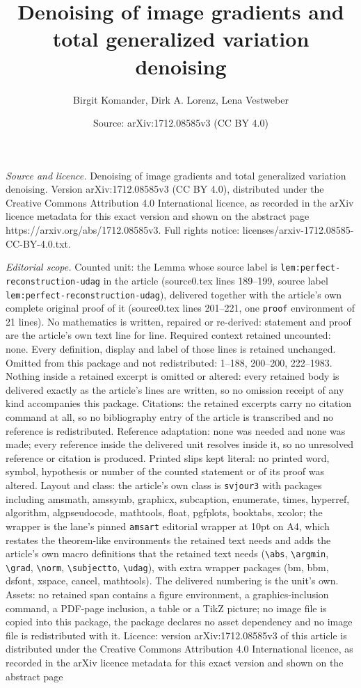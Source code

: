 \documentclass[10pt,a4paper]{amsart}
\title[Denoising of image gradients and total generalized variation]{Denoising of image gradients and total generalized variation denoising}
\author{Birgit Komander, Dirk A. Lorenz, Lena Vestweber}
\date{Source: arXiv:1712.08585v3 (CC BY 4.0)}
\begin{document}
\maketitle

\noindent\emph{Source and licence.} Denoising of image gradients and total generalized variation denoising. Version arXiv:1712.08585v3 (CC BY 4.0), distributed under the Creative Commons Attribution 4.0 International licence, as recorded in the arXiv licence metadata for this exact version and shown on the abstract page https://arxiv.org/abs/1712.08585v3. Full rights notice: licenses/arxiv-1712.08585-CC-BY-4.0.txt.\par\smallskip

\noindent\textit{Editorial scope.} Counted unit: the Lemma whose source label is \texttt{lem:perfect-reconstruction-udag} in the article (source0.tex lines 189--199, source label \texttt{lem:perfect-reconstruction-udag}), delivered together with the article's own complete original proof of it (source0.tex lines 201--221, one \texttt{proof} environment of 21 lines). No mathematics is written, repaired or re-derived: statement and proof are the article's own text line for line. Required context retained uncounted: none. Every definition, display and label of those lines is retained unchanged. Omitted from this package and not redistributed: 1--188, 200--200, 222--1983. Nothing inside a retained excerpt is omitted or altered: every retained body is delivered exactly as the article's lines are written, so no omission receipt of any kind accompanies this package. Citations: the retained excerpts carry no citation command at all, so no bibliography entry of the article is transcribed and no reference is redistributed. Reference adaptation: none was needed and none was made; every reference inside the delivered unit resolves inside it, so no unresolved reference or citation is produced. Printed slips kept literal: no printed word, symbol, hypothesis or number of the counted statement or of its proof was altered. Layout and class: the article's own class is \texttt{svjour3} with packages including amsmath, amssymb, graphicx, subcaption, enumerate, times, hyperref, algorithm, algpseudocode, mathtools, float, pgfplots, booktabs, xcolor; the wrapper is the lane's pinned \texttt{amsart} editorial wrapper at 10pt on A4, which restates the theorem-like environments the retained text needs and adds the article's own macro definitions that the retained text needs (\texttt{\textbackslash abs}, \texttt{\textbackslash argmin}, \texttt{\textbackslash grad}, \texttt{\textbackslash norm}, \texttt{\textbackslash subjectto}, \texttt{\textbackslash udag}), with extra wrapper packages (bm, bbm, dsfont, xspace, cancel, mathtools). The delivered numbering is the unit's own. Assets: no retained span contains a figure environment, a graphics-inclusion command, a PDF-page inclusion, a table or a TikZ picture; no image file is copied into this package, the package declares no asset dependency and no image file is redistributed with it. Licence: version arXiv:1712.08585v3 of this article is distributed under the Creative Commons Attribution 4.0 International licence, as recorded in the arXiv licence metadata for this exact version and shown on the abstract page 
\end{document}
